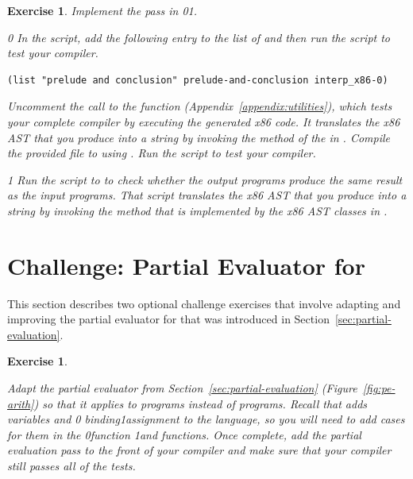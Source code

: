 \documentclass[7x10,nocrop]{TimesAPriori_MIT}%
\def\racketEd{0}
\def\pythonEd{1}
\def\edition{1}
\newcommand{\racket}[1]{{\if\edition\racketEd{#1}\fi}}
\newcommand{\python}[1]{{\if\edition\pythonEd #1\fi}}
\newtheorem{exercise}[theorem]{Exercise}
\begin{document}
\begin{exercise}\normalfont
%
Implement the  pass in
\racket{}\python{}.
%
{\if\edition\racketEd
In the  script, add the following entry to the
list of  and then run the script to test your compiler.
\begin{lstlisting}
(list "prelude and conclusion" prelude-and-conclusion interp_x86-0)
\end{lstlisting}
%  
Uncomment the call to the  function
(Appendix~\ref{appendix:utilities}), which tests your complete
compiler by executing the generated x86 code. It translates the x86
AST that you produce into a string by invoking the 
method of the  in . Compile
the provided  file to  using
. Run the script to test your compiler.
%
\fi}
{\if\edition\pythonEd
%
Run the  script to to check whether the output
programs produce the same result as the input programs. That script
translates the x86 AST that you produce into a string by invoking the
 method that is implemented by the x86 AST classes in
.
%
\fi}

\end{exercise}


\section{Challenge: Partial Evaluator for \LangVar{}}
\label{sec:pe-Lvar}

This section describes two optional challenge exercises that involve
adapting and improving the partial evaluator for \LangInt{} that was
introduced in Section~\ref{sec:partial-evaluation}.

\begin{exercise}\label{ex:pe-Lvar}
\normalfont
  
Adapt the partial evaluator from Section~\ref{sec:partial-evaluation}
(Figure~\ref{fig:pe-arith}) so that it applies to \LangVar{} programs
instead of \LangInt{} programs. Recall that \LangVar{} adds variables and
%
\racket{ binding}\python{assignment}
%
to the \LangInt{} language, so you will need to add cases for them in
the 
%
\racket{function}
%
\python{and  functions}.
%
Once complete, add the partial evaluation pass to the front of your
compiler and make sure that your compiler still passes all of the
tests.
\end{exercise}
\end{document}
